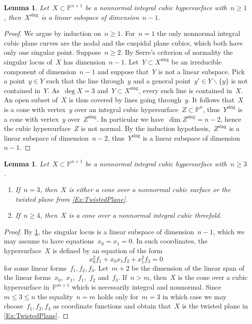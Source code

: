 \documentclass[a4paper]{amsart}
\newcommand{\bbP}{\mathbb{P}}
\newcommand{\sing}{{\mathrm{sing}}}
\renewcommand{\le}{\leqslant}
\renewcommand{\ge}{\geqslant}
\theoremstyle{plain}
\newtheorem{lemma}[theorem]{Lemma}
\theoremstyle{definition}
\numberwithin{equation}{section}
\begin{document}
\begin{lemma}\label{lemma singular locus nonormal cubic}
Let~$X\subset \bbP^{n+1}$ be a nonnormal integral cubic hypersurface with~$n \ge 1$, then~$X^\sing$ is a linear subspace of dimension~$n-1$.
\end{lemma}
\begin{proof}
We argue by induction on~$n \ge 1$. For~$n=1$ the only nonnormal integral cubic plane curves are the nodal and the cuspidal plane cubics, which both have only one singular point. Suppose~$n \ge 2$. By Serre's criterion of normality the singular locus of~$X$ has dimension~$n - 1$. Let~$Y \subset X^\sing$ be an irreducible component of dimension~$n-1$ and suppose that~$Y$ is not a linear subspace. Pick a point~$y \in Y$ such that the line through~$y$ and a general point~$y' \in Y \smallsetminus \{ y \}$ is not contained in~$Y$. As~$\deg X =3$ and~$Y \subset X^\sing$, every such line is contained in~$X$. An open subset of~$X$ is thus covered by lines going through~$y$. It follows that~$X$ is a cone with vertex~$y$ over an integral cubic hypersurface~$Z\subset \bbP^n$, thus~$Y^\sing$ is a cone with vertex~$y$ over~$Z^\sing$. In particular we have~$\dim Z^\sing=n-2$, hence the cubic hypersurface~$Z$ is not normal. By the induction hypothesis,~$Z^\sing$ is a linear subspace of dimension~$n-2$, thus~$Y^\sing$ is a linear subspace of dimension~$n-1$.
\end{proof}

\begin{lemma} \label{Lemma:ClassificationNonnormalCubics} Let~$X\subset \bbP^{n+1}$ be a nonnormal integral cubic hypersurface with~$n \ge 3$. 
\begin{enumerate}
\item If~$n = 3$, then~$X$ is either a cone over a nonnormal cubic surface or the twisted plane from \cref{Ex:TwistedPlane}. \smallskip
\item If~$n \ge 4$, then~$X$ is a cone over a nonnormal integral cubic threefold.
\end{enumerate}
\end{lemma}

\begin{proof} By \cref{lemma singular locus nonormal cubic}, the singular locus is a linear subspace of dimension~$n - 1$, which we may assume to have equations~$x_0 = x_1 = 0$. In such coordinates, the hypersurface~$X$ is defined by an equation of the form
\[
x_0^2 f_1 + x_0x_1f_2 + x_1^2f_3 = 0
\]
for some linear forms~$f_1,f_2,f_3$. Let~$m+2$ be the dimension of the linear span of the linear forms~$x_0$,~$x_1$,~$f_1$,~$f_2$ and~$f_3$. If~$n > m$, then~$X$ is the cone over a cubic hypersurface in~$\bbP^{m+1}$ which is necessarily integral and nonnormal. Since~$m \le 3 \le n$ the equality~$n = m$ holds only for~$m = 3$ in which case we may choose~$f_1,f_2,f_3$ as coordinate functions and obtain that~$X$ is the twisted plane in \cref{Ex:TwistedPlane}.
\end{proof}
\end{document}
